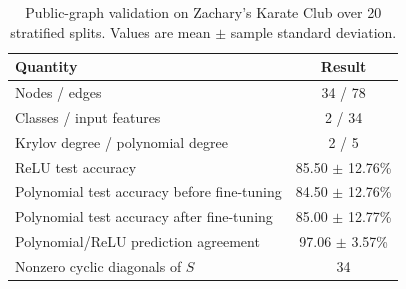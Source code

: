\begin{table}[t]
\centering
\caption{Public-graph validation on Zachary's Karate Club over 20 stratified splits. Values are mean $\pm$ sample standard deviation.}
\label{tab:karate-public}
\begin{tabular}{lc}
\toprule
Quantity & Result \\
\midrule
Nodes / edges & 34 / 78 \\
Classes / input features & 2 / 34 \\
Krylov degree / polynomial degree & 2 / 5 \\
ReLU test accuracy & 85.50 $\pm$ 12.76\% \\
Polynomial test accuracy before fine-tuning & 84.50 $\pm$ 12.76\% \\
Polynomial test accuracy after fine-tuning & 85.00 $\pm$ 12.77\% \\
Polynomial/ReLU prediction agreement & 97.06 $\pm$ 3.57\% \\
Nonzero cyclic diagonals of $S$ & 34 \\
\bottomrule
\end{tabular}
\end{table}
